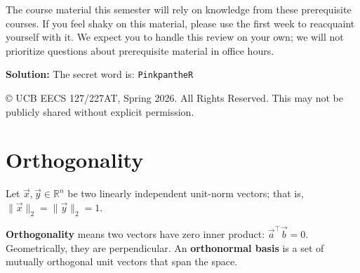 \documentclass[10pt]{article}
\theoremstyle{definition}
\theoremstyle{plain}
\newcommand{\RR}{\mathbb{R}}
\begin{document}
The course material this semester will rely on knowledge from these prerequisite courses. If you feel shaky on this material, please use the first week to reacquaint yourself with it. We expect you to handle this review on your own; we will not prioritize questions about prerequisite material in office hours.

\vspace{1em}
\noindent\textbf{Solution:} The secret word is: \texttt{PinkpantheR}

\vfill
\noindent\footnotesize{\copyright{} UCB EECS 127/227AT, Spring 2026. \scriptsize{All Rights Reserved. This may not be publicly shared without explicit permission.}}

\newpage

\section{Orthogonality}

Let $\vec{x}, \vec{y} \in \RR^n$ be two linearly independent unit-norm vectors; that is, $\|\vec{x}\|_2 = \|\vec{y}\|_2 = 1$.

\begin{keyconcept}
\textbf{Orthogonality} means two vectors have zero inner product: $\vec{a}^\top \vec{b} = 0$. Geometrically, they are perpendicular. An \textbf{orthonormal basis} is a set of mutually orthogonal unit vectors that span the space.
\end{keyconcept}
\end{document}
